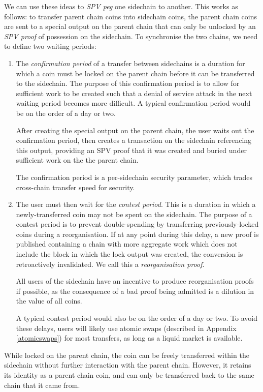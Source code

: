 \documentclass[letterpaper]{article}
\newcommand{\mainchain}{parent chain\xspace}
\newcommand{\maincoin}{parent chain coin\xspace}
\newcommand{\maincoins}{parent chain coins\xspace}
\newcommand{\sidechain}{sidechain\xspace}
\newcommand{\sidecoins}{sidechain coins\xspace}
\begin{document}
We can use these ideas to \emph{SPV peg} one \sidechain to another.
This works as follows: to transfer \maincoins into
\sidecoins, the \maincoins are sent to a special output on the \mainchain
that can only be unlocked by an \emph{SPV proof} of possession on the
\sidechain. To synchronise the two chains, we need to define two waiting periods:
\begin{enumerate}
\item The \emph{confirmation period} of a transfer between sidechains is a
duration for which a coin must be locked on the \mainchain before it can
be transferred to the \sidechain. The purpose of this confirmation period is
to allow for sufficient work to be created such that a denial of service attack in the next waiting period becomes more difficult. A typical confirmation period would be on the order of a
day or two.

After creating the special output on the \mainchain, the user waits out the confirmation period,
then creates a transaction on the \sidechain referencing this output,
providing an SPV proof that it was created and buried under sufficient
work on the the \mainchain.

The confirmation period is a per-sidechain security parameter, which trades
cross-chain transfer speed for security.

\item The user must then wait for the \emph{contest period}. This is a
duration in which a newly-transferred coin may not be spent on the \sidechain.
The purpose of a contest period is to prevent
double-spending by transferring previously-locked coins during a reorganisation.
If at any point during this delay, a new proof is
published containing a chain with more aggregate work which does not include the
block in which the lock output was created, the
conversion is retroactively invalidated. We call this a \emph{reorganisation
proof}.

All users of the \sidechain have an incentive to produce reorganisation proofs
if possible, as the consequence of a bad proof being admitted is a dilution
in the value of all coins.

A
typical contest period would also be on the order of a day or two. To avoid these
delays, users will likely use atomic swaps (described in Appendix \ref{atomicswaps})
for most transfers, as long as a liquid market is available.
\end{enumerate}


While locked on the \mainchain, the coin can be freely transferred within
the \sidechain without further interaction with the \mainchain. However,
it retains its identity as a \maincoin, and can only be transferred back
to the same chain that it came from.
\end{document}
